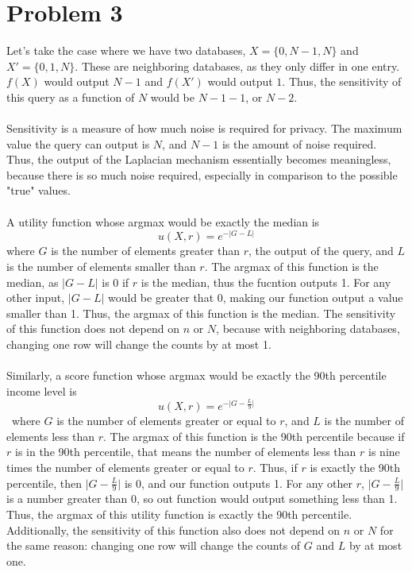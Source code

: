 \documentclass[12pt, letterpaper]{article}
\begin{document}
\newpage
\section{Problem 3}
Let's take the case where we have two databases, $X=\{0,N-1,N\}$ and $X'=\{0,1,N\}$. These are neighboring databases, as they only differ in one entry. $f(X)$ would output $N-1$ and $f(X')$ would output $1$. Thus, the sensitivity of this query as a function of $N$ would be $N-1-1$,  or $N-2$.\\
\\
Sensitivity is a measure of how much noise is required for privacy. The maximum value the query can output is $N$, and $N-1$ is the amount of noise required. Thus, the output of the Laplacian mechanism essentially becomes meaningless, because there is so much noise required, especially in comparison to the possible "true" values.\\
\\
A utility function whose argmax would be exactly the median is
\[u(X,r)=e^{-\lvert G-L\rvert}\]
where $G$ is the number of elements greater than $r$, the output of the query, and $L$ is the number of elements smaller than $r$.  The argmax of this function is the median, as $\lvert G-L\rvert$ is 0 if $r$ is the median, thus the fucntion outputs 1. For any other input, $\lvert G-L\rvert$ would be greater that 0, making our function output a value smaller than 1. Thus, the argmax of this function is the median. The sensitivity of this function does not depend on $n$ or $N$, because with neighboring databases, changing one row will change the counts by at most 1.\\
\\
Similarly, a score function whose argmax would be exactly the 90th percentile income level is
\[u(X,r)=e^{-\lvert G-\frac{L}{9}\rvert}\]\
where $G$ is the number of elements greater or equal to $r$, and $L$ is the number of elements less than $r$. The argmax of this function is the 90th percentile because if $r$ is in the 90th percentile, that means the number of elements less than $r$ is nine times the number of elements greater or equal to $r$. Thus, if $r$ is exactly the 90th percentile, then $\lvert G-\frac{L}{9}\rvert$ is 0, and our function outputs 1. For any other $r$, $\lvert G-\frac{L}{9}\rvert$ is a number greater than 0, so out function would output something less than 1. Thus, the argmax of this utility function is exactly the 90th percentile. Additionally, the sensitivity of this function also does not depend on $n$ or $N$ for the same reason: changing one row will change the counts of $G$ and $L$ by at most one.
\end{document}

